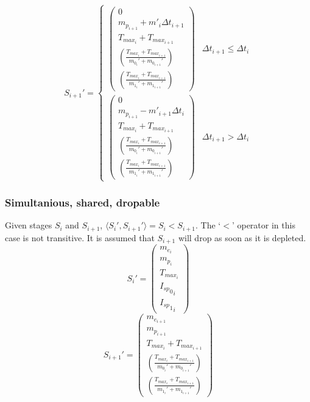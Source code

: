 \begin{equation}
    S_{i+1}' =
        \begin{cases}
            \begin{pmatrix}
                0 \\
                m_{p_{i+1}} + {m'}_{i}{\Delta{}t}_{i+1} \\
                T_{max_{i}} + T_{max_{i+1}} \\
                \left(\frac{T_{max_{i}} + T_{max_{i+1}}}{m_{0_i}'+m_{0_{i+1}}'}\right) \\
                \left(\frac{T_{max_{i}} + T_{max_{i+1}}}{m_{1_i}'+m_{1_{i+1}}'}\right)
            \end{pmatrix} &
            {\Delta{}t}_{i+1} \leq {\Delta{}t}_{i} \\
            \begin{pmatrix}
                0 \\
                m_{p_{i+1}} - {m'}_{i+1}{\Delta{}t}_{i} \\
                T_{max_{i}} + T_{max_{i+1}} \\
                \left(\frac{T_{max_{i}} + T_{max_{i+1}}}{m_{0_i}'+m_{0_{i+1}}'}\right) \\
                \left(\frac{T_{max_{i}} + T_{max_{i+1}}}{m_{1_i}'+m_{1_{i+1}}'}\right)
            \end{pmatrix} &
            {\Delta{}t}_{i+1} > {\Delta{}t}_{i}
        \end{cases}
\end{equation}

\subsubsection{Simultanious, shared, dropable}
Given stages $S_{i}$ and $S_{i+1}$, $\langle S_{i}', S_{i+1}' \rangle = S_{i} < S_{i+1}$.
The `$<$' operator in this case is not transitive.
It is assumed that $S_{i+1}$ will drop as soon as it is depleted.
\begin{equation}
    S_{i}' =
        \begin{pmatrix}
            m_{e_{i}} \\
            m_{p_{i}} \\
            T_{max_{i}} \\
            {{I_{sp}}_{0}}_i \\
            {{I_{sp}}_{1}}_i
        \end{pmatrix}
\end{equation}
\begin{equation}
    S_{i+1}' =
        \begin{pmatrix}
            m_{e_{i+1}} \\
            m_{p_{i+1}} \\
            T_{max_{i}} + T_{max_{i+1}} \\
            \left(\frac{T_{max_{i}} + T_{max_{i+1}}}{m_{0_i}'+m_{0_{i+1}}'}\right) \\
            \left(\frac{T_{max_{i}} + T_{max_{i+1}}}{m_{1_i}'+m_{1_{i+1}}'}\right)
        \end{pmatrix}
\end{equation}

